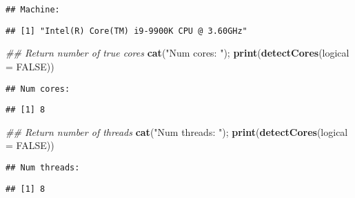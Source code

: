 \documentclass[11pt,]{article}
\newenvironment{Shaded}{\begin{snugshade}}{\end{snugshade}}
\newcommand{\CommentTok}[1]{\textcolor[rgb]{0.56,0.35,0.01}{\textit{#1}}}
\newcommand{\DataTypeTok}[1]{\textcolor[rgb]{0.13,0.29,0.53}{#1}}
\newcommand{\KeywordTok}[1]{\textcolor[rgb]{0.13,0.29,0.53}{\textbf{#1}}}
\newcommand{\NormalTok}[1]{#1}
\newcommand{\OperatorTok}[1]{\textcolor[rgb]{0.81,0.36,0.00}{\textbf{#1}}}
\newcommand{\OtherTok}[1]{\textcolor[rgb]{0.56,0.35,0.01}{#1}}
\newcommand{\StringTok}[1]{\textcolor[rgb]{0.31,0.60,0.02}{#1}}
\begin{document}
\begin{Shaded}
\end{Shaded}

\begin{verbatim}
## Machine:
\end{verbatim}

\begin{verbatim}
## [1] "Intel(R) Core(TM) i9-9900K CPU @ 3.60GHz"
\end{verbatim}

\begin{Shaded}
\begin{Highlighting}[]
\CommentTok{## Return number of true cores}
\KeywordTok{cat}\NormalTok{(}\StringTok{"Num cores:   "}\NormalTok{); }\KeywordTok{print}\NormalTok{(}\KeywordTok{detectCores}\NormalTok{(}\DataTypeTok{logical =} \OtherTok{FALSE}\NormalTok{))}
\end{Highlighting}
\end{Shaded}

\begin{verbatim}
## Num cores:
\end{verbatim}

\begin{verbatim}
## [1] 8
\end{verbatim}

\begin{Shaded}
\begin{Highlighting}[]
\CommentTok{## Return number of threads}
\KeywordTok{cat}\NormalTok{(}\StringTok{"Num threads: "}\NormalTok{); }\KeywordTok{print}\NormalTok{(}\KeywordTok{detectCores}\NormalTok{(}\DataTypeTok{logical =} \OtherTok{FALSE}\NormalTok{))}
\end{Highlighting}
\end{Shaded}

\begin{verbatim}
## Num threads:
\end{verbatim}

\begin{verbatim}
## [1] 8
\end{verbatim}
\end{document}
